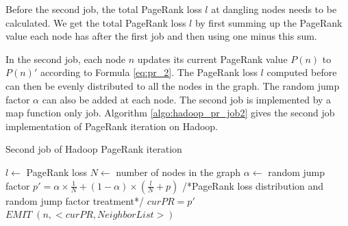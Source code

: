\documentclass[10pt,conference,compsocconf]{IEEEtran}
\begin{document}
Before the second job, the total PageRank loss $l$ at dangling nodes needs to be calculated. We get the total PageRank loss $l$ by first summing up the PageRank value each node has after the first job and then using one minus this sum.

In the second job, each node $n$ updates its current PageRank value $P(n)$ to $P(n)'$ according to Formula \ref{eq:pr_2}. The PageRank loss $l$ computed before can then be evenly distributed to all the nodes in the graph. The random jump factor $\alpha$ can also be added at each node. The second job is implemented by a map function only job. Algorithm \ref{algo:hadoop_pr_job2} gives the second job implementation of PageRank iteration on Hadoop.
\begin{algorithm}[!t]
\caption{Second job of Hadoop PageRank iteration}
\label{algo:hadoop_pr_job2}
\begin{algorithmic}[1]
    \State $l \leftarrow$ PageRank loss\;
    \State $N \leftarrow$ number of nodes in the graph
    \State $\alpha \leftarrow$ random jump factor    
    \State $p' = \alpha\times\frac{1}{N} + (1 - \alpha) \times (\frac{l}{N} + p)$
    {\small /*PageRank loss distribution and random jump factor treatment*/}
    \State $curPR = p'$     
    \State $EMIT\;(n, <curPR, NeighborList>)$    
\EndFunction
\end{algorithmic}
\end{algorithm}



\end{document}
